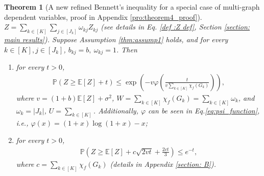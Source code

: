 \documentclass{article}
\def\eE{\mathbb{E}}
\def\pP{\mathbb{P}}
\def\defeq{\overset{\textup{def}}{=}}
\newtheorem{theorem}{Theorem}
\begin{document}
    \begin{theorem}[A new refined Bennett's inequality for a special case of multi-graph dependent variables, proof in Appendix \ref{pro:theorem4_proof}]
    \label{thm:bennett_inequality_refined}
    $Z = \sum_{k \in [K]} \sum_{j \in [J_k]} \omega_{kj}Z_{kj} $ (see details in Eq. \eqref{def :Z def}, Section \ref{section: main results}).  
    Suppose Assumption \ref{thm:assump1} holds, and for every $k \in [K], j \in [J_k]$,  $b_{kj}=b, ~\omega_{kj}=1$. Then 

        
        \begin{enumerate}[(1)]
            \item for every $t > 0$,
                \begin{align}
                \label{eq:thm_bennet_1_new}
                    \pP (Z \geq \eE[Z] + t) \leq \exp \left( - v \varphi \left( \frac{t}{v { \sum_{k \in [K]} \chi_{f} (G_k)} } \right) \right) ,
                \end{align}
            where $v = (1 + b) \eE [Z] + \sigma^2$, $W = \sum_{k \in [K]} \chi_f(G_k) = \sum_{k \in [K]} \omega_k$, and $\omega_k = |J_k|$, $U = \sum_{k \in [K]}$. Additionally,  $\varphi$ can be seen in  Eq.\eqref{eq:psi_function}, i.e., $\varphi(x) = (1+x) \log(1+x)-x$;
            \item for every $t > 0$,
                \begin{align}
                \label{eq:thm_bennet_2_new}
                    \pP (Z \geq \eE [Z] + c \sqrt{2vt} + \frac{2ct}{3}) \leq e^{-t} ,
                \end{align}
                where $c = \sum_{k \in [K]} \chi_{f} (G_k)$ (details in Appendix \ref{section: B}).  
        \end{enumerate} 

    \end{theorem}
\end{document}
